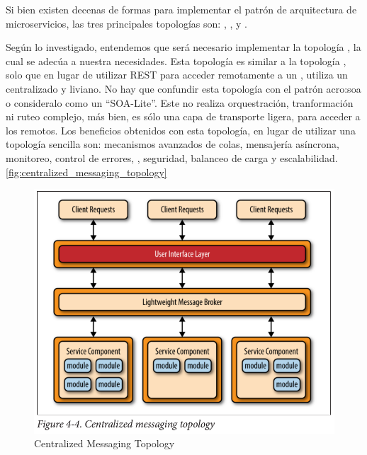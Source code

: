 Si bien existen decenas de formas para implementar el patrón de arquitectura de microservicios, las tres principales topologías son: , , y .

Según lo investigado, entendemos que será necesario implementar la topología , la cual se adecúa a nuestra necesidades.  Esta topología es similar a la topología , solo que en lugar de utilizar REST para acceder remotamente a un , utiliza un  centralizado y liviano.  No hay que confundir esta topología con el patrón \gls{acro:soa} o consideralo como un ``SOA-Lite''.  Este  no realiza orquestración, tranformación ni ruteo complejo, más bien, es sólo una capa de transporte ligera, para acceder a los  remotos.  Los beneficios obtenidos con esta topología, en lugar de utilizar una topología sencilla  son: mecanismos avanzados de colas, mensajería asíncrona, monitoreo, control de errores, , seguridad, balanceo de carga y escalabilidad.
\autoref{fig:centralized_messaging_topology}

\begin{figure}[H]
  \includegraphics[width=\linewidth]{src/images/02-capitulo-2/centralized_messaging_topology.png}
  \caption{Centralized Messaging Topology}
  \label{fig:centralized_messaging_topology}
\end{figure}

